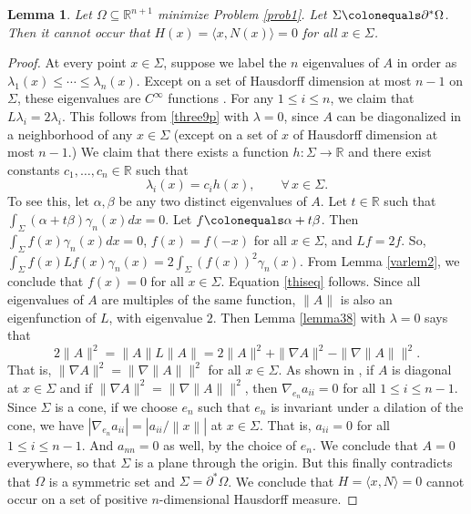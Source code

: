 \documentclass[12pt,reqno]{amsart}
\newtheorem{lemma}[theorem]{Lemma}
\theoremstyle{definition}
\renewcommand{\subset}{\subseteq}
\newcommand{\abs}[1]{\left|#1\right|}                   %
\newcommand{\vnormt}[1]{\left\|#1\right\|}    %
\newcommand{\vnormtf}[1]{\|#1\|}                         %
\newcommand{\R}{\mathbb{R}}
\newcommand{\redA}{\partial^{*}\Omega}
\newcommand{\sdimn}{n}
\newcommand{\adimn}{n+1}
\newcommand{\scon}{\lambda}
\begin{document}
\begin{lemma}\label{lemma52}
Let $\Omega\subset\R^{\adimn}$ minimize Problem \ref{prob1}.  Let $\Sigma\colonequals\redA$.  Then it cannot occur that $H(x)=\langle x, N(x)\rangle=0$ for all $x\in\Sigma$.
\end{lemma}
\begin{proof}
At every point $x\in\Sigma$, suppose we label the $\sdimn$ eigenvalues of $A$ in order as $\lambda_{1}(x)\leq\cdots\leq\lambda_{\sdimn}(x)$.  Except on a set of Hausdorff dimension at most $\sdimn-1$ on $\Sigma$, these eigenvalues are $C^{\infty}$ functions \cite[Theorem II.5.4, p. 111]{kato66}.  For any $1\leq i\leq \sdimn$, we claim that $L\lambda_{i}=2\lambda_{i}$.  This follows from \eqref{three9p} with $\scon=0$, since $A$ can be diagonalized in a neighborhood of any $x\in\Sigma$ (except on a set of $x$ of Hausdorff dimension at most $\sdimn-1$.)  We claim that there exists a function $h\colon\Sigma\to\R$ and there exist constants $c_{1},\ldots,c_{\sdimn}\in\R$ such that
\begin{equation}\label{thiseq}
\lambda_{i}(x)=c_{i}h(x),\qquad\forall\,x\in\Sigma.
\end{equation}
To see this, let $\alpha,\beta$ be any two distinct eigenvalues of $A$.  Let $t\in\R$ such that $\int_{\Sigma}(\alpha+t\beta)\gamma_{\sdimn}(x)dx=0$.  Let $f\colonequals\alpha+t\beta$.  Then $\int_{\Sigma}f(x)\gamma_{\sdimn}(x)dx=0$, $f(x)=f(-x)$ for all $x\in\Sigma$, and $Lf=2f$.  So, $\int_{\Sigma}f(x)Lf(x)\gamma_{\sdimn}(x)=2\int_{\Sigma}(f(x))^{2}\gamma_{\sdimn}(x)$.  From Lemma \ref{varlem2}, we conclude that $f(x)=0$ for all $x\in\Sigma$.  Equation \eqref{thiseq} follows.  Since all eigenvalues of $A$ are multiples of the same function, $\vnormtf{A}$ is also an eigenfunction of $L$, with eigenvalue $2$.  Then Lemma \ref{lemma38} with $\scon=0$ says that
$$2\vnormtf{A}^{2}=\vnormtf{A}L\vnormtf{A}=2\vnormtf{A}^{2}+\vnormtf{\nabla A}^{2}-\vnormtf{\nabla\vnormtf{A}}^{2}.$$
That is, $\vnormtf{\nabla A}^{2}=\vnormtf{\nabla\vnormtf{A}}^{2}$ for all $x\in\Sigma$.  As shown in \cite[Eq. (10.33)]{colding12a}, if $A$ is diagonal at $x\in\Sigma$ and if $\vnormtf{\nabla A}^{2}=\vnormtf{\nabla\vnormtf{A}}^{2}$, then $\nabla_{e_{\sdimn}}a_{ii}=0$ for all $1\leq i\leq\sdimn-1$.  Since $\Sigma$ is a cone, if we choose $e_{\sdimn}$ such that $e_{\sdimn}$ is invariant under a dilation of the cone, we have $\abs{\nabla_{e_{\sdimn}}a_{ii}}=\abs{a_{ii}/\vnormt{x}}$ at $x\in\Sigma$.  That is, $a_{ii}=0$ for all $1\leq i\leq \sdimn-1$.  And $a_{\sdimn\sdimn}=0$ as well, by the choice of $e_{\sdimn}$.  We conclude that $A=0$ everywhere, so that $\Sigma$ is a plane through the origin.  But this finally contradicts that $\Omega$ is a symmetric set and $\Sigma=\redA$.  We conclude that $H=\langle x,N\rangle=0$ cannot occur on a set of positive $\sdimn$-dimensional Hausdorff measure.
\end{proof}
\end{document}

